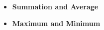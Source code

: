\documentclass[11pt]{article}
\begin{document}
\begin{itemize}
				\newpage
				\item \textbf{ \LARGE \color{mypurple} Summation \color{black} and \color{mypurple} Average \color{black}}\\
				\newpage
				\item \textbf{ \LARGE \color{mypurple} Maximum \color{black} and \color{mypurple} Minimum \color{black}}\\
\end{itemize}


	
\end{document}
